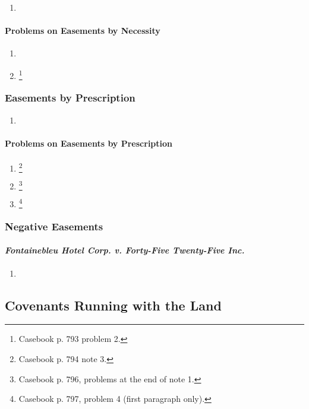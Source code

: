 \begin{enumerate}
    \item %
\end{enumerate}

\paragraph{Problems on Easements by Necessity}

\begin{enumerate}
    \item %
    \item \footnote{Casebook p. 793 problem 2.}
\end{enumerate}

\subsubsection{Easements by Prescription}

\begin{enumerate}
    \item %
\end{enumerate}

\paragraph{Problems on Easements by Prescription}

\begin{enumerate}
    \item \footnote{Casebook p. 794 note 3.}
    \item \footnote{Casebook p. 796, problems at the end of note 1.}
    \item \footnote{Casebook p. 797, problem 4 (first paragraph only).}
\end{enumerate}

\subsubsection{Negative Easements}


\paragraph{\emph{Fontainebleu Hotel Corp. v. Forty-Five Twenty-Five Inc.}}

\begin{enumerate}
    \item %
\end{enumerate}


\subsection{Covenants Running with the Land}

